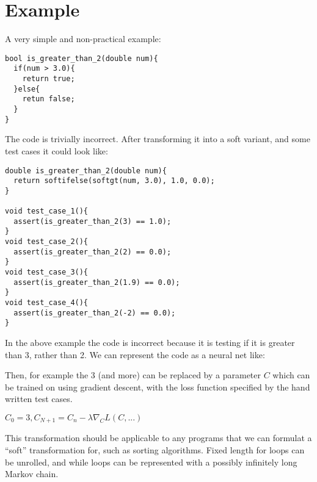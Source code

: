 \documentclass{article}
\begin{document}
\section*{Example}
A very simple and non-practical example:
\begin{verbatim}
bool is_greater_than_2(double num){
  if(num > 3.0){
    return true;
  }else{
    retun false;
  }
}
\end{verbatim}
The code is trivially incorrect. After transforming it into a soft variant, and some test cases it could look like:
\begin{verbatim}
double is_greater_than_2(double num){
  return softifelse(softgt(num, 3.0), 1.0, 0.0);
}

void test_case_1(){
  assert(is_greater_than_2(3) == 1.0);
}
void test_case_2(){
  assert(is_greater_than_2(2) == 0.0);
}
void test_case_3(){
  assert(is_greater_than_2(1.9) == 0.0);
}
void test_case_4(){
  assert(is_greater_than_2(-2) == 0.0);
}
\end{verbatim}
In the above example the code is incorrect because it is testing if it is greater than 3, rather than 2. We can represent the code as a neural net like:\\
Then, for example the 3 (and more) can be replaced by a parameter $C$ which can be trained on using gradient descent, with the loss function specified by the hand written test cases.
\begin{center}
  $C_0 = 3, C_{N+1} = C_{n} - \lambda \nabla_C L(C, ...)$
\end{center}
This transformation should be applicable to any programs that we can formulat a ``soft'' transformation for, such as sorting algorithms. Fixed length for loops can be unrolled, and while loops can be represented with a possibly infinitely long Markov chain.
\end{document}
